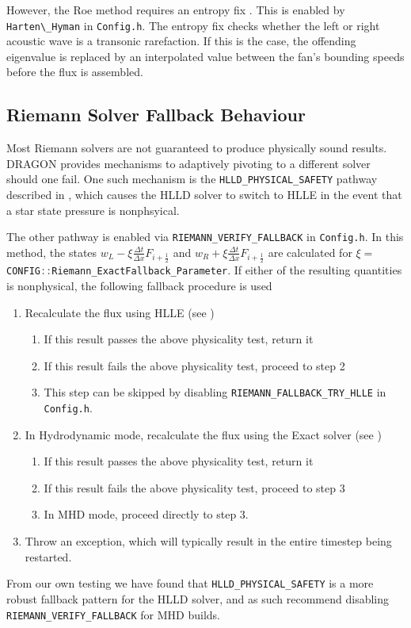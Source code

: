 \documentclass[11pt]{report}
\newcommand{\cpp}[1]{\lstinline[language=C++]{#1}}
\newcommand{\bash}[1]{\lstinline[language=bash]{#1}}
\begin{document}
However, the Roe method requires an entropy fix \citep{HartenHyman1983}. This is enabled by \cpp{Harten\_Hyman} in \bash{Config.h}.
The entropy fix checks whether the left or right acoustic wave is a transonic rarefaction. If this is the case, the offending eigenvalue is replaced by an interpolated value between the fan's bounding speeds before the flux is assembled.

\subsection{Riemann Solver Fallback Behaviour}\label{sec:riemann_fallback}

Most Riemann solvers are not guaranteed to produce physically sound results. DRAGON provides mechanisms to adaptively pivoting to a different solver should one fail.
One such mechanism is the \cpp{HLLD_PHYSICAL_SAFETY} pathway described in , which causes the HLLD solver to switch to HLLE in the event that a star state pressure is nonphsyical. 

The other pathway is enabled via \cpp{RIEMANN_VERIFY_FALLBACK} in \bash{Config.h}.  In this method, the states $w_L - \xi\frac{\Delta t}{\Delta x} F_{i+\frac12}$ and $w_R + \xi\frac{\Delta t}{\Delta x} F_{i+\frac12}$ are calculated for $\xi=$\cpp{CONFIG::Riemann_ExactFallback_Parameter}. 
If either of the resulting quantities is nonphysical, the following fallback procedure is used
\begin{enumerate}
\item Recalculate the flux using HLLE (see )
\begin{enumerate}
\item If this result passes the above physicality test, return it
\item If this result fails the above physicality test, proceed to step 2
\item This step can be skipped by disabling \cpp{RIEMANN_FALLBACK_TRY_HLLE} in \bash{Config.h}.
\end{enumerate}
\item In Hydrodynamic mode, recalculate the flux using the Exact solver (see )
\begin{enumerate}
\item If this result passes the above physicality test, return it
\item If this result fails the above physicality test, proceed to step 3
\item In MHD mode, proceed directly to step 3.
\end{enumerate}
\item Throw an exception, which will typically result in the entire timestep being restarted.
\end{enumerate}
From our own testing we have found that \cpp{HLLD_PHYSICAL_SAFETY} is a more robust fallback pattern for the HLLD solver, and as such recommend disabling \cpp{RIEMANN_VERIFY_FALLBACK} for MHD builds.
\end{document}

